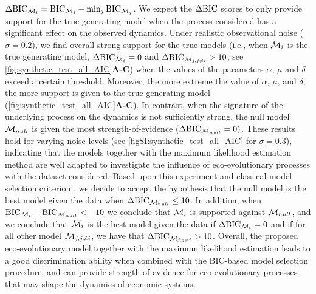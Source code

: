%
$\Delta \text{BIC}_{\mathcal{M}_i} = \text{BIC}_{\mathcal{M}_i} - \min_{j} \text{BIC}_{\mathcal{M}_j}$. 
%
We expect the $\Delta \text{BIC}$ scores to only provide support for the true generating model when the process considered has a significant effect on the observed dynamics.
Under realistic observational noise ($\sigma = 0.2$), we find overall strong support for the true models (i.e., when $\mathcal{M}_i$ is the true generating model, $\Delta\text{BIC}_{\mathcal{M}_{i}} = 0$ and $\Delta\text{BIC}_{\mathcal{M}_{j,j\neq i}} > 10$, see \cref{fig:synthetic_test_all_AIC}\textbf{A-C}) when the values of the parameters $\alpha$, $\mu$ and $\delta$ exceed a certain threshold. 
% 
% 
% 
Moreover, the more extreme the value of $\alpha$, $\mu$, and $\delta$, the more support is given to the true generating model (\cref{fig:synthetic_test_all_AIC}\textbf{A-C}).
% 
In contrast, when the signature of the underlying process on the dynamics is not sufficiently strong, the null model $\mathcal{M}_{null}$ is given the most strength-of-evidence ($\Delta\text{BIC}_{\mathcal{M}_{null}} = 0)$.
% 
% 
These results hold for varying noise levels (see \cref{figSI:synthetic_test_all_AIC} for $\sigma = 0.3$), indicating that the models together with the maximum likelihood estimation method are well adapted to investigate the influence of eco-evolutionary processes with the dataset considered.
%
Based upon this experiment and classical model selection criterion \citep{Burnham2002}, we decide to accept the hypothesis that the null model is the best model given the data when $\Delta \text{BIC}_{\mathcal{M}_{null}} \leq 10$. In addition, when $\text{BIC}_{\mathcal{M}_i} - \text{BIC}_{\mathcal{M}_{null}} < -10$ we conclude that $\mathcal{M}_i$ is supported against $\mathcal{M}_{null}$, and we conclude that $\mathcal{M}_i$ is the best model given the data if $\Delta \text{BIC}_{\mathcal{M}_i} = 0 $ and if for all other model $\mathcal{M}_{j,j \neq i}$, we have that $\Delta \text{BIC}_{\mathcal{M}_{j,j \neq i}} > 10$.
Overall, the proposed eco-evolutionary model together with the maximum likelihood estimation leads to a good discrimination ability when combined with the BIC-based model selection procedure, and can provide strength-of-evidence for eco-evolutionary processes that may shape the dynamics of economic systems.


